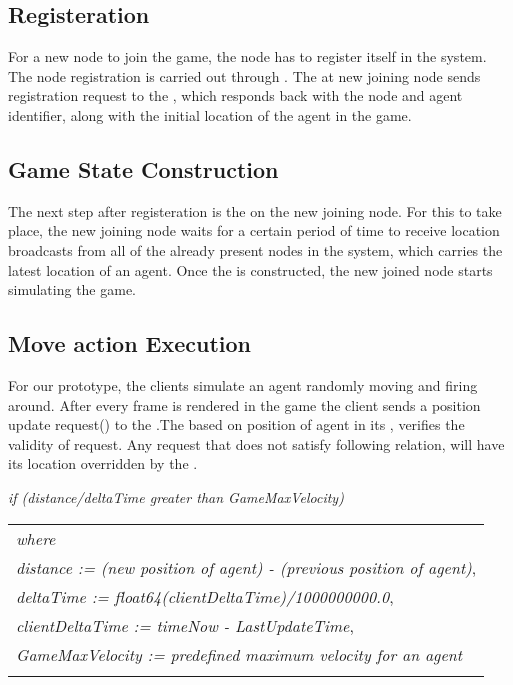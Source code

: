 \subsection{Registeration}
	For a  new node to join the game, the node has to register itself in the system. The node registration is carried out through \activityServer. The \localServer at new joining node sends registration request to the \activityServer, which responds back with the node and agent identifier, along with the initial location of the agent in the game.

\subsection{Game State Construction}
	The next step after registeration is the \gameStateConstruction on the new joining node. For this to take place, the new joining node waits for a certain period of time to receive location broadcasts from all of the already present nodes in the system, which carries  the latest location of an agent. Once the \gamestate is constructed, the new joined node starts simulating the game.	

\subsection{Move action Execution}
	For our prototype, the clients simulate an agent randomly moving and firing around. After every frame is rendered in the game the client sends a position update request(\move{\agent}{\position}) to the \localServer.The \localServer based on position of agent in its \gamestate, verifies the validity of request. Any request that does not satisfy following relation, will have its location overridden by the \localServer.


	\emph{if (distance/deltaTime greater than GameMaxVelocity) } \\
\begin{tabular}{l}
	\emph{where} \\ 
	\emph{distance := (new position of agent) - (previous position of agent)}, \\
	\emph{deltaTime := float64(clientDeltaTime)/1000000000.0}, \\
	\emph{clientDeltaTime := timeNow - LastUpdateTime},  \\
	\emph{GameMaxVelocity := predefined maximum velocity for an agent} \\
	\\
\end{tabular}	
	 


